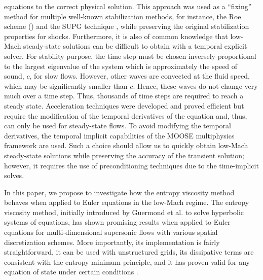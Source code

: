 \documentclass[preprint,10pt]{elsarticle}
\begin{document}
equations to the correct physical solution. This approach was used as a ``fixing'' method for multiple well-known stabilization 
methods, for instance, the Roe scheme (\cite{Roe}) and the SUPG technique \cite{LowMach3}, while preserving the original stabilization 
properties for shocks. Furthermore, it is also of common knowledge that low-Mach steady-state solutions can be difficult to obtain with 
a temporal explicit solver. For stability purpose, the time step must be chosen inversely proportional to the largest eigenvalue of the 
system which is approximately the speed of sound, $c$, for slow flows. However, other waves are convected at the fluid speed, which may 
be significantly smaller than $c$. Hence, these waves do not change very much over a time step. Thus, thousands of time steps are required 
to reach a steady state. Acceleration techniques were developed and proved efficient \cite{LowMach2} but require the modification of the 
temporal derivatives of the equation and, thus, can only be used for steady-state flows. To avoid modifying the temporal derivatives, 
the temporal implicit capabilities of the MOOSE multiphysics framework \cite{MOOSE} are used. Such a choice should allow us to quickly 
obtain low-Mach steady-state solutions while preserving the accuracy of the transient solution; however, it requires the use of 
preconditioning techniques due to the time-implicit solves.

In this paper, we propose to investigate how the entropy viscosity method behaves when applied to Euler equations in the low-Mach regime. 
The entropy viscosity method, initially introduced by Guermond et al. to solve hyperbolic systems of equations, has shown promising 
results when applied to Euler equations for multi-dimensional supersonic flows with various spatial discretization schemes. 
More importantly, its implementation is fairly 
straightforward, it can be used with unstructured grids, its dissipative terms are consistent with the entropy minimum principle, and it 
has proven valid for any equation of state under certain conditions \cite{jlg}.
\end{document}
